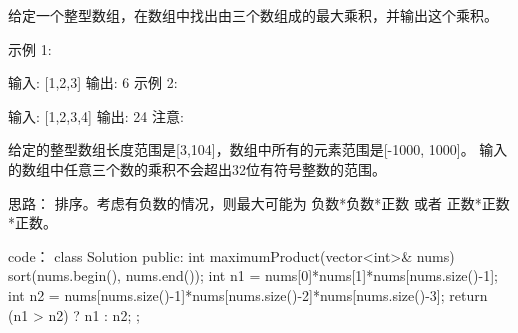 给定一个整型数组，在数组中找出由三个数组成的最大乘积，并输出这个乘积。

示例 1:

输入: [1,2,3]
输出: 6
示例 2:

输入: [1,2,3,4]
输出: 24
注意:

给定的整型数组长度范围是[3,104]，数组中所有的元素范围是[-1000, 1000]。
输入的数组中任意三个数的乘积不会超出32位有符号整数的范围。



























思路：
排序。考虑有负数的情况，则最大可能为 负数*负数*正数 或者 正数*正数*正数。



























code：
class Solution {
public:
    int maximumProduct(vector<int>& nums) {
        sort(nums.begin(), nums.end());
        int n1 = nums[0]*nums[1]*nums[nums.size()-1];
        int n2 = nums[nums.size()-1]*nums[nums.size()-2]*nums[nums.size()-3];
        return (n1 > n2) ? n1 : n2;
    }
};